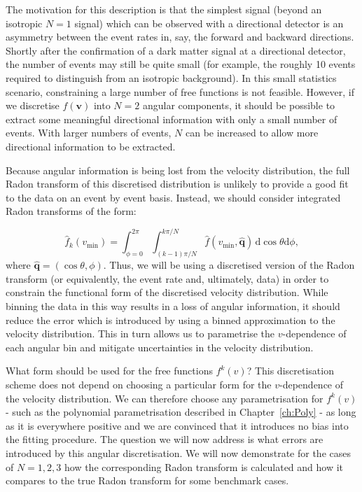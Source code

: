 The motivation for this description is that the simplest signal (beyond an isotropic $N=1$ signal) which can be observed with a directional detector is an asymmetry between the event rates in, say, the forward and backward directions. Shortly after the confirmation of a dark matter signal at a directional detector, the number of events may still be quite small (for example, the roughly 10 events required to distinguish from an isotropic background). In this small statistics scenario, constraining a large number of free functions is not feasible. However, if we discretise $f(\textbf{v})$ into $N=2$ angular components, it should be possible to extract some meaningful directional information with only a small number of events. With larger numbers of events, $N$ can be increased to allow more directional information to be extracted.

Because angular information is being lost from the velocity distribution, the full Radon transform of this discretised distribution is unlikely to provide a good fit to the data on an event by event basis. Instead, we should consider integrated Radon transforms of the form:

\begin{equation}
\hat{f}_k(v_\textrm{min}) = \int_{\phi = 0}^{2\pi} \int_{(k-1)\pi/N}^{k\pi/N} \hat{f}(v_\textrm{min}, \hat{\textbf{q}})\, \mathrm{d}\cos\theta\mathrm{d}\phi,
\end{equation}
 where $\hat{\textbf{q}} = (\cos\theta, \phi)$. Thus, we will be using a discretised version of the Radon transform (or equivalently, the event rate and, ultimately, data) in order to constrain the functional form of the discretised velocity distribution. While binning the data in this way results in a loss of angular information, it should reduce the error which is introduced by using a binned approximation to the velocity distribution. This in turn allows us to parametrise the $v$-dependence of each angular bin and mitigate uncertainties in the velocity distribution.

What form should be used for the free functions $f^k(v)$? This discretisation scheme does not depend on choosing a particular form for the $v$-dependence of the velocity distribution. We can therefore choose any parametrisation for $f^k(v)$ - such as the polynomial parametrisation described in Chapter~\ref{ch:Poly} - as long as it is everywhere positive and we are convinced that it introduces no bias into the fitting procedure. The question we will now address is what errors are introduced by this angular discretisation. We will now demonstrate for the cases of $N=1, 2, 3$ how the corresponding Radon transform is calculated and how it compares to the true Radon transform for some benchmark cases.


